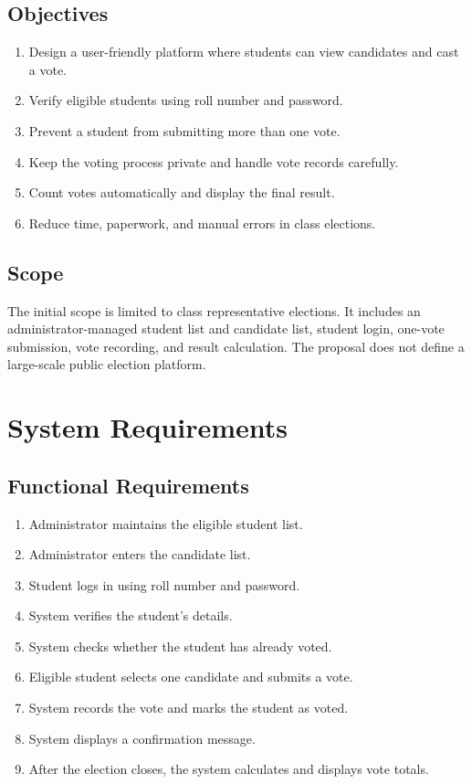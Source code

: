 \documentclass[12pt,a4paper]{report}
\begin{document}
\section{Objectives}
\begin{enumerate}
\item Design a user-friendly platform where students can view candidates and cast a vote.
\item Verify eligible students using roll number and password.
\item Prevent a student from submitting more than one vote.
\item Keep the voting process private and handle vote records carefully.
\item Count votes automatically and display the final result.
\item Reduce time, paperwork, and manual errors in class elections.
\end{enumerate}
\section{Scope}
The initial scope is limited to class representative elections. It includes an administrator-managed student list and candidate list, student login, one-vote submission, vote recording, and result calculation. The proposal does not define a large-scale public election platform.

\chapter{System Requirements}
\section{Functional Requirements}
\begin{enumerate}
\item Administrator maintains the eligible student list.
\item Administrator enters the candidate list.
\item Student logs in using roll number and password.
\item System verifies the student's details.
\item System checks whether the student has already voted.
\item Eligible student selects one candidate and submits a vote.
\item System records the vote and marks the student as voted.
\item System displays a confirmation message.
\item After the election closes, the system calculates and displays vote totals.
\end{enumerate}
\end{document}

